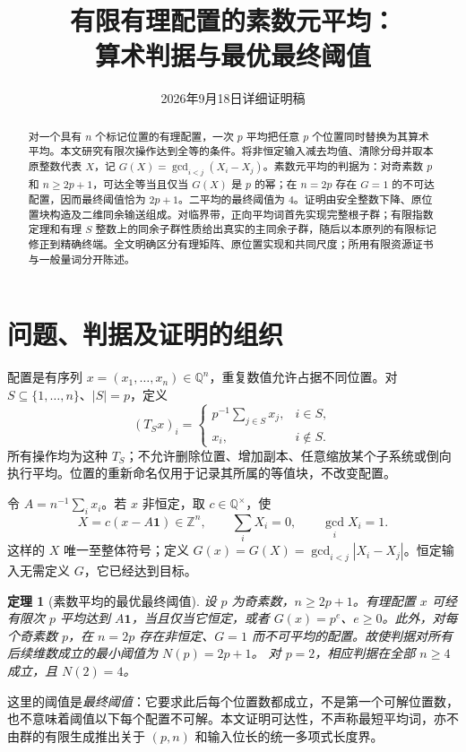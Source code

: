 \documentclass[11pt,a4paper]{article}
\title{有限有理配置的素数元平均：\protect\\算术判据与最优最终阈值}
\author{}
\date{2026年9月18日\quad 详细证明稿}
\newcommand{\QQ}{\mathbb Q}
\newcommand{\ZZ}{\mathbb Z}
\newtheorem{theorem}{定理}[section]
\theoremstyle{definition}
\numberwithin{equation}{section}
\begin{document}
\maketitle
\begin{abstract}
对一个具有 $n$ 个标记位置的有理配置，一次 $p$ 平均把任意 $p$ 个位置同时替换为其算术平均。本文研究有限次操作达到全等的条件。将非恒定输入减去均值、清除分母并取本原整数代表 $X$，记 $G(X)=\gcd_{i<j}(X_i-X_j)$。素数元平均的判据为：对奇素数 $p$ 和 $n\ge 2p+1$，可达全等当且仅当 $G(X)$ 是 $p$ 的幂；在 $n=2p$ 存在 $G=1$ 的不可达配置，因而最终阈值恰为 $2p+1$。二平均的最终阈值为 $4$。证明由安全整数下降、原位置块构造及二维同余输送组成。对临界带，正向平均词首先实现完整根子群；有限指数定理和有理 $S$ 整数上的同余子群性质给出真实的主同余子群，随后以本原列的有限标记修正到精确终端。全文明确区分有理矩阵、原位置实现和共同尺度；所用有限资源证书与一般量词分开陈述。
\end{abstract}
\tableofcontents
\newpage

\section{问题、判据及证明的组织}\label{sec:intro}
配置是有序列 $x=(x_1,\ldots,x_n)\in\QQ^n$，重复数值允许占据不同位置。对 $S\subseteq\{1,\ldots,n\}$、$|S|=p$，定义
\[
 (T_Sx)_i=\begin{cases}p^{-1}\sum_{j\in S}x_j,&i\in S,\\x_i,&i\notin S.\end{cases}
\]
所有操作均为这种 $T_S$；不允许删除位置、增加副本、任意缩放某个子系统或倒向执行平均。位置的重新命名仅用于记录其所属的等值块，不改变配置。

令 $A=n^{-1}\sum_i x_i$。若 $x$ 非恒定，取 $c\in\QQ^\times$，使
\[
 X=c(x-A\mathbf1)\in\ZZ^n,\qquad \sum_iX_i=0,\qquad \gcd_iX_i=1.
\]
这样的 $X$ 唯一至整体符号；定义 $G(x)=G(X)=\gcd_{i<j}|X_i-X_j|$。恒定输入无需定义 $G$，它已经达到目标。

\begin{theorem}[素数平均的最优最终阈值]\label{thm:main}
设 $p$ 为奇素数，$n\ge2p+1$。有理配置 $x$ 可经有限次 $p$ 平均达到 $A\mathbf1$，当且仅当它恒定，或者 $G(x)=p^e$、$e\ge0$。此外，对每个奇素数 $p$，在 $n=2p$ 存在非恒定、$G=1$ 而不可平均的配置。故使判据对所有后续维数成立的最小阈值为 $N(p)=2p+1$。
对 $p=2$，相应判据在全部 $n\ge4$ 成立，且 $N(2)=4$。
\end{theorem}

这里的阈值是\emph{最终阈值}：它要求此后每个位置数都成立，不是第一个可解位置数，也不意味着阈值以下每个配置不可解。本文证明可达性，不声称最短平均词，亦不由群的有限生成推出关于 $(p,n)$ 和输入位长的统一多项式长度界。
\end{document}
